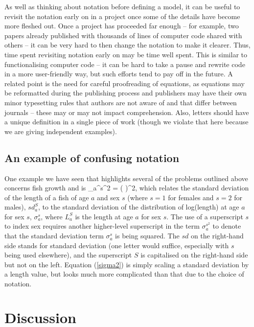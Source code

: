 As well as thinking about notation before defining a model, it can be useful
to revisit the notation early on in a project once some of the details have
become more fleshed out. Once a project has proceeded far enough -- for example,
two papers already published with thousands of lines of computer code shared
with others -- it can be very hard to then change the notation to make it
clearer. Thus, time spent revisiting notation early on may be time well spent.
This is similar to functionalising computer code -- it can be hard to take a
pause and rewrite code in a more user-friendly way, but such efforts tend to
pay off in the future. A related point is the need for careful proofreading of
equations, as equations may be reformatted during the publishing process and
publishers may have their own minor typesetting
rules that authors are not aware of and that differ between journals -- these may or may not impact comprehension.
Also, letters should have a unique definition in a single piece of work
(though we violate that here because we are giving independent examples).

\subsection*{An example of confusing notation}

One example we have seen that highlights several of the problems outlined
above concerns fish growth and is
\eb
\sigma_a^{s^2} = \left(  \right)^2,
\label{sigma2}
\ee
which relates the standard deviation of the length of a fish of age $a$ and sex
$s$ (where $s=1$ for females and $s=2$ for males),
$sd^S_a$, to the standard deviation of the distribution of log(length) at
age $a$ for sex $s$, $\sigma_a^{s}$, where $L^S_a$ is the length at age $a$
for sex $s$.
The use of a superscript $s$ to index sex requires another higher-level
superscript in the term $\sigma_a^{s^2}$ to denote that the standard deviation
term $\sigma_a^s$ is being squared. The $sd$ on the right-hand side stands for
standard deviation (one letter would suffice, especially with $s$ being used
elsewhere), and the superscript $S$ is capitalised on the right-hand side but not
on the left. Equation (\ref{sigma2}) is simply scaling a standard deviation by
a length value, but looks much more complicated than that due to the choice
of notation.

\section*{Discussion}


